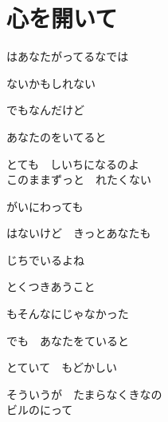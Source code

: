 \section{ 心を開いて}

\large{

はあなたがってるなでは

ないかもしれない

でもなんだけど

あなたのをいてると

とても　しいちになるのよ
\\

このままずっと　れたくない

がいにわっても

はないけど　きっとあなたも

じちでいるよね
\\


とくつきあうこと

もそんなにじゃなかった

でも　あなたをていると

とていて　もどかしい

そういうが　たまらなくきなの
\\

ビルのにって

}
